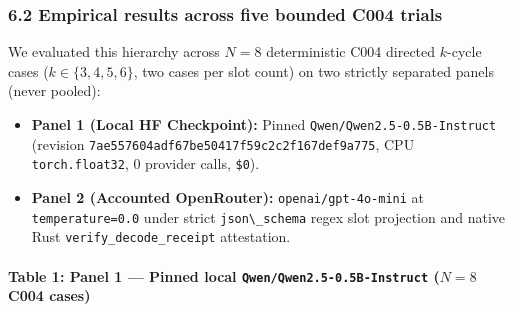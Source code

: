 \documentclass[
  11pt,
]{article}
\newcommand{\passthrough}[1]{#1}
\providecommand{\tightlist}{%
  \setlength{\itemsep}{0pt}\setlength{\parskip}{0pt}}
\begin{document}
\subsubsection{6.2 Empirical results across five bounded C004
trials}\label{empirical-results-across-five-bounded-c004-trials}

We evaluated this hierarchy across \(N = 8\) deterministic C004 directed
\(k\)-cycle cases
(\(k \in \{3,\allowbreak  4,\allowbreak  5,\allowbreak  6\}\), two cases
per slot count) on two strictly separated panels (never pooled):

\begin{itemize}
\tightlist
\item
  \textbf{Panel 1 (Local HF Checkpoint):} Pinned
  \nolinkurl{Qwen/Qwen2.5-0.5B-Instruct} (revision
  \nolinkurl{7ae557604adf67be50417f59c2c2f167def9a775}, CPU
  \nolinkurl{torch.float32}, 0 provider calls,
  \passthrough{\lstinline!$0!}).
\item
  \textbf{Panel 2 (Accounted OpenRouter):}
  \nolinkurl{openai/gpt-4o-mini} at \nolinkurl{temperature=0.0} under
  strict \passthrough{\lstinline!json\_schema!} regex slot projection
  and native Rust \nolinkurl{verify_decode_receipt} attestation.
\end{itemize}

\paragraph{\texorpdfstring{Table 1: Panel 1 --- Pinned local
\nolinkurl{Qwen/Qwen2.5-0.5B-Instruct} (\(N = 8\) C004
cases)}{Table 1: Panel 1 --- Pinned local  (N = 8 C004 cases)}}\label{table-1-panel-1-pinned-local-qwenqwen2.5-0.5b-instruct-n-8-c004-cases}
\end{document}
